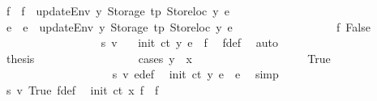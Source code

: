 \begin{isabellebody}
\ f{\isacharprime}{\kern0pt}\ \ {\isachardoublequoteopen}f{\isacharprime}{\kern0pt}\ {\isacharequal}{\kern0pt}\ updateEnv\ y\ {\isacharparenleft}{\kern0pt}Storage\ tp{\isacharprime}{\kern0pt}{\isacharparenright}{\kern0pt}\ {\isacharparenleft}{\kern0pt}Storeloc\ y{\isacharparenright}{\kern0pt}\ e{\isachardoublequoteclose}\isanewline
\ \ \ \ \ \ \ \ \ \ \ \ \ \ \ \ \isamarkupfalse%
\ e{\isacharprime}{\kern0pt}{\isacharprime}{\kern0pt}\ \ {\isachardoublequoteopen}e{\isacharprime}{\kern0pt}{\isacharprime}{\kern0pt}\ {\isacharequal}{\kern0pt}\ updateEnv\ y\ {\isacharparenleft}{\kern0pt}Storage\ tp{\isacharprime}{\kern0pt}{\isacharparenright}{\kern0pt}\ {\isacharparenleft}{\kern0pt}Storeloc\ y{\isacharparenright}{\kern0pt}\ e{\isacharprime}{\kern0pt}{\isachardoublequoteclose}\isanewline
\ \ \ \ \ \ \ \ \ \ \ \ \ \ \ \ \isamarkupfalse%
\ f{}{\isacharcolon}{\kern0pt}\ False\isanewline
\ \ \ \ \ \ \ \ \ \ \ \ \ \ \ \ \isamarkupfalse%
\ s{}\ v{}\ \isamarkupfalse%
\ {\isacharasterisk}{\kern0pt}{\isacharasterisk}{\kern0pt}{\isacharcolon}{\kern0pt}\ {\isachardoublequoteopen}init\ ct\ y\ e\ {\isacharequal}{\kern0pt}\ f{\isacharprime}{\kern0pt}{\isachardoublequoteclose}\ \isamarkupfalse%
\ f{\isacharprime}{\kern0pt}{\isacharunderscore}{\kern0pt}def\ \isamarkupfalse%
\ auto\isanewline
\ \ \ \ \ \ \ \ \ \ \ \ \ \ \ \ \isamarkupfalse%
\ {\isacharquery}{\kern0pt}thesis\isanewline
\ \ \ \ \ \ \ \ \ \ \ \ \ \ \ \ \isamarkupfalse%
\ {\isacharparenleft}{\kern0pt}cases\ {\isachardoublequoteopen}y\ {\isacharequal}{\kern0pt}\ x{\isachardoublequoteclose}{\isacharparenright}{\kern0pt}\isanewline
\ \ \ \ \ \ \ \ \ \ \ \ \ \ \ \ \ \ \isamarkupfalse%
\ True\isanewline
\ \ \ \ \ \ \ \ \ \ \ \ \ \ \ \ \ \ \isamarkupfalse%
\ s{}\ v{}\ e{\isacharprime}{\kern0pt}{\isacharunderscore}{\kern0pt}def\ \isamarkupfalse%
\ {\isachardoublequoteopen}init\ ct\ y\ e{\isacharprime}{\kern0pt}\ {\isacharequal}{\kern0pt}\ e{\isacharprime}{\kern0pt}{\isachardoublequoteclose}\ \isamarkupfalse%
\ simp\isanewline
\ \ \ \ \ \ \ \ \ \ \ \ \ \ \ \ \ \ \isamarkupfalse%
\ \isamarkupfalse%
\ s{}\ v{}\ True\ f{\isacharprime}{\kern0pt}{\isacharunderscore}{\kern0pt}def\ \isamarkupfalse%
\ {\isachardoublequoteopen}init\ ct\ x\ f{\isacharprime}{\kern0pt}\ {\isacharequal}{\kern0pt}\ f{\isacharprime}{\kern0pt}{\isachardoublequoteclose}\ \isamarkupfalse%

\end{isabellebody}
